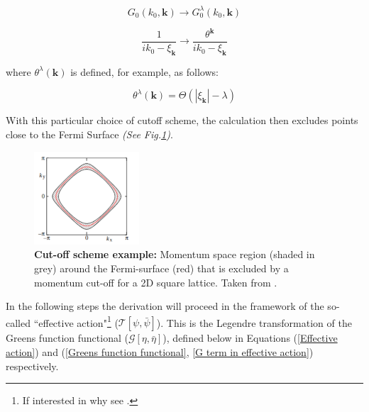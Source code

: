 \documentclass[11pt]{article}
\begin{document}
\begin{equation} \label{propagator transform 1}
    G_0(k_0, \textbf{k}) \rightarrow G_0^{\lambda}(k_0, \textbf{k})
\end{equation}


\begin{equation} \label{propagator transform 2}
    \frac{1}{ik_0 - \xi_{\textbf{k}}} \rightarrow \frac{\theta^{\textbf{k}}}{ik_0 - \xi_{\textbf{k}}}
\end{equation}

\noindent where $\theta^{\lambda}(\textbf{k})$ is defined, for example, as follows:

\begin{equation} \label{theta def}
    \theta^{\lambda}(\textbf{k}) = \Theta(|\xi_{\textbf{k}}| - \lambda)    
\end{equation}

\noindent With this particular choice of cutoff scheme, the calculation then excludes points close to the Fermi Surface \textit{(See Fig.\ref{fig:Truncation})}. \par
\begin{figure}[htbp]  %
    \centering
    \includegraphics[width=0.35\textwidth]{Truncation.png}  %
    \caption{\textbf{Cut-off scheme example:} Momentum space region (shaded in grey) around the Fermi-surface (red) that is excluded 
    by a momentum cut-off for a 2D square lattice. Taken from \cite {metzner2012functional}.}
    \label{fig:Truncation}
\end{figure}

\medskip
\noindent In the following steps the derivation will proceed in the framework of the  so-called ``effective action"\footnote{If interested in why see \cite{metzner2012functional}.}  ($\mathcal{T}[\psi, \bar{\psi}]$).
This is the Legendre transformation of the Greens function functional ($\mathcal{G}[\eta, \bar{\eta}]$), defined below in Equations (\ref{Effective action})  and  (\ref{Greens function functional}, \ref{G term in effective action}) respectively. 
\end{document}
